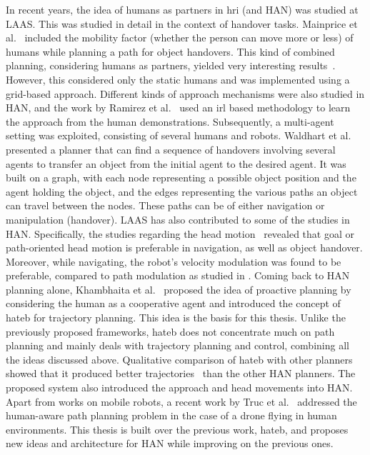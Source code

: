 In recent years, the idea of humans as partners in \acrshort{hri} (and HAN) was studied at LAAS. This was studied in detail in the context of handover tasks. Mainprice et al.~\cite{mainprice_sharing_2012} included the mobility factor (whether the person can move more or less) of humans while planning a path for object handovers. This kind of combined planning, considering humans as partners, yielded very interesting results~\cite{gharbi_natural_2013}. However, this considered only the static humans and was implemented using a grid-based approach. Different kinds of approach mechanisms were also studied in HAN, and the work by Ramirez et al.~\cite{ramirez2016robots} used an \acrshort{irl} based methodology to learn the approach from the human demonstrations. Subsequently, a multi-agent setting was exploited, consisting of several humans and robots. Waldhart et al.~\cite{waldhart_planning_2015} presented a planner that can find a sequence of handovers involving several agents to transfer an object from the initial agent to the desired agent. It was built on a graph, with each node representing a possible object position and the agent holding the object, and the edges representing the various paths an object can travel between the nodes. These paths can be of either navigation or manipulation (handover). LAAS has also contributed to some of the studies in HAN. Specifically, the studies regarding the head motion~\cite{gharbi_toward_2015, khambhaita2016head} revealed that goal or path-oriented head motion is preferable in navigation, as well as object handover. Moreover, while navigating, the robot’s velocity modulation was found to be preferable, compared to path modulation as studied in \cite{kruse_evaluating_2014, kruse2012legible}. Coming back to HAN planning alone, Khambhaita et al.~\cite{khambhaita2017viewing, khambhaita_human-robot_2017} proposed the idea of proactive planning by considering the human as a cooperative agent and introduced the concept of \acrfull{hateb} for trajectory planning. This idea is the basis for this thesis. Unlike the previously proposed frameworks, \acrshort{hateb} does not concentrate much on path planning and mainly deals with trajectory planning and control, combining all the ideas discussed above. Qualitative comparison of \acrshort{hateb} with other planners showed that it produced better trajectories~\cite{khambhaita_assessing_2017} than the other HAN planners. The proposed system also introduced the approach and head movements into HAN. Apart from works on mobile robots, a recent work by Truc et al.~\cite{truc2022khaos} addressed the human-aware path planning problem in the case of a drone flying in human environments. This thesis is built over the previous work, \acrshort{hateb}, and proposes new ideas and architecture for HAN while improving on the previous ones.

